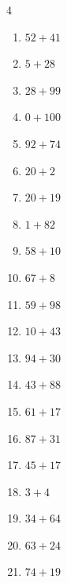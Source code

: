 \begin{multicols}{4}
\begin{enumerate}
  \item $52+41$
        \phantom{$=93$}

  \item $5+28$
        \phantom{$=33$}

  \item $28+99$
        \phantom{$=127$}

  \item $0+100$
        \phantom{$=100$}

  \item $92+74$
        \phantom{$=166$}

  \item $20+2$
        \phantom{$=22$}

  \item $20+19$
        \phantom{$=39$}

  \item $1+82$
        \phantom{$=83$}

  \item $58+10$
        \phantom{$=68$}

  \item $67+8$
        \phantom{$=75$}

  \item $59+98$
        \phantom{$=157$}

  \item $10+43$
        \phantom{$=53$}

  \item $94+30$
        \phantom{$=124$}

  \item $43+88$
        \phantom{$=131$}

\columnbreak %

\resetques

  \item $61+17$
        \phantom{$=78$}

  \item $87+31$
        \phantom{$=118$}

  \item $45+17$
        \phantom{$=62$}

  \item $3+4$
        \phantom{$=7$}

  \item $34+64$
        \phantom{$=98$}

  \item $63+24$
        \phantom{$=87$}

  \item $74+19$
        \phantom{$=93$}


\end{enumerate}
\end{multicols}
